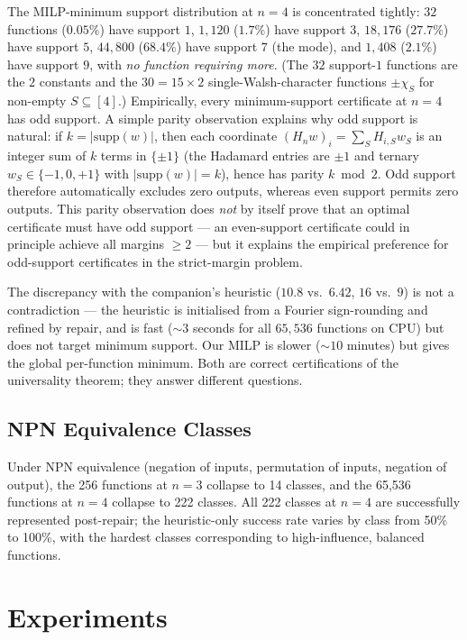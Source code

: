 \documentclass[11pt]{article}
\newcommand{\supp}{\mathrm{supp}}
\begin{document}
The MILP-minimum support distribution at $n=4$ is concentrated tightly: $32$ functions ($0.05\%$) have support $1$, $1{,}120$ ($1.7\%$) have support $3$, $18{,}176$ ($27.7\%$) have support $5$, $44{,}800$ ($68.4\%$) have support $7$ (the mode), and $1{,}408$ ($2.1\%$) have support $9$, with \emph{no function requiring more}. (The $32$ support-$1$ functions are the $2$ constants and the $30 = 15 \times 2$ single-Walsh-character functions $\pm \chi_S$ for non-empty $S \subseteq [4]$.) Empirically, every minimum-support certificate at $n=4$ has odd support. A simple parity observation explains why odd support is natural: if $k = |\supp(w)|$, then each coordinate $(H_n w)_i = \sum_S H_{i,S} w_S$ is an integer sum of $k$ terms in $\{\pm 1\}$ (the Hadamard entries are $\pm 1$ and ternary $w_S \in \{-1, 0, +1\}$ with $|\supp(w)| = k$), hence has parity $k \bmod 2$. Odd support therefore automatically excludes zero outputs, whereas even support permits zero outputs. This parity observation does \emph{not} by itself prove that an optimal certificate must have odd support --- an even-support certificate could in principle achieve all margins $\ge 2$ --- but it explains the empirical preference for odd-support certificates in the strict-margin problem.

The discrepancy with the companion's heuristic ($10.8$ vs.\ $6.42$, $16$ vs.\ $9$) is not a contradiction --- the heuristic is initialised from a Fourier sign-rounding and refined by repair, and is fast ($\sim 3$ seconds for all $65{,}536$ functions on CPU) but does not target minimum support. Our MILP is slower ($\sim 10$ minutes) but gives the global per-function minimum. Both are correct certifications of the universality theorem; they answer different questions.

\subsection{NPN Equivalence Classes}

Under NPN equivalence (negation of inputs, permutation of inputs, negation of output), the 256 functions at $n=3$ collapse to 14 classes, and the 65{,}536 functions at $n=4$ collapse to 222 classes. All 222 classes at $n=4$ are successfully represented post-repair; the heuristic-only success rate varies by class from 50\% to 100\%, with the hardest classes corresponding to high-influence, balanced functions.


\section{Experiments}
\label{sec:experiments}
\end{document}
